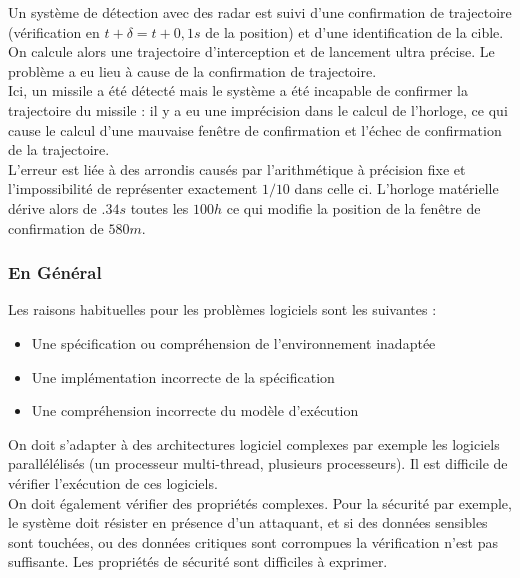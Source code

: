 \documentclass{cours}
\begin{document}
Un système de détection avec des radar est suivi d'une confirmation de trajectoire (vérification en $t + \delta =t + 0,1s$ de la position) et d'une identification de la cible. On calcule alors une trajectoire d'interception et de lancement ultra précise. Le problème a eu lieu à cause de la confirmation de trajectoire.\\
Ici, un missile a été détecté mais le système a été incapable de confirmer la trajectoire du missile : il y a eu une imprécision dans le calcul de l'horloge, ce qui cause le calcul d'une mauvaise fenêtre de confirmation et l'échec de confirmation de la trajectoire.\\
L'erreur est liée à des arrondis causés par l'arithmétique à précision fixe et l'impossibilité de représenter exactement $1/10$ dans celle ci. L'horloge matérielle dérive alors de $.34s$ toutes les $100h$ ce qui modifie la position de la fenêtre de confirmation de $580m$.


\subsubsection{En Général}
Les raisons habituelles pour les problèmes logiciels sont les suivantes : 
\begin{itemize}
    \item Une spécification ou compréhension de l'environnement inadaptée
    \item Une implémentation incorrecte de la spécification
    \item Une compréhension incorrecte du modèle d'exécution
\end{itemize}
On doit s'adapter à des architectures logiciel complexes par exemple les logiciels parallélélisés (un processeur multi-thread, plusieurs processeurs). Il est difficile de vérifier l'exécution de ces logiciels.\\
On doit également vérifier des propriétés complexes. Pour la sécurité par exemple, le système doit résister en présence d'un attaquant, et si des données sensibles sont touchées, ou des données critiques sont corrompues la vérification n'est pas suffisante. Les propriétés de sécurité sont difficiles à exprimer.
\end{document}

